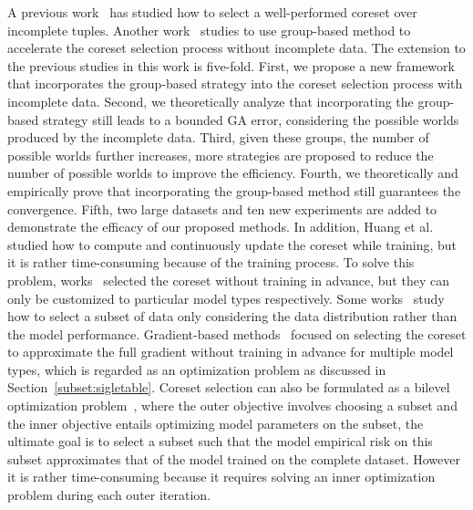  A previous work~\cite{goodcore} has studied how to select a well-performed coreset over incomplete tuples.  Another work~\cite{fastcore} studies to use group-based method to accelerate the coreset selection process without incomplete data. The extension to the previous studies in this work is five-fold. 
%
First, we propose a new framework that incorporates the group-based strategy into the coreset selection process with incomplete data.
%
 Second, we theoretically analyze that incorporating the group-based strategy   still leads to a bounded GA error, considering the possible worlds produced by the incomplete data. 
 Third, given these groups, the number of possible worlds further increases, more strategies are proposed to  reduce the number of possible worlds to improve the efficiency.
 Fourth, we theoretically and empirically  prove that incorporating the group-based method still guarantees the convergence.
  Fifth, two large datasets  and ten new experiments are added   to demonstrate the efficacy of our proposed methods. 
%
% 
%
  In addition, Huang et al.~\cite{DBLP:conf/icml/HuangHLFD21} studied how to compute and continuously update the coreset while training, %
but it is rather time-consuming because of the training process. 
 To solve this problem, works~\cite{DBLP:conf/icml/CampbellB18, DBLP:journals/corr/BravermanFL16}   selected the coreset without training in advance, but they can only be customized to particular model types respectively. %
 Some works~\cite{sener2017active,chen2012super, Zhang2019SmallGAN, Agarwal2020Context} study how to select a subset of data only considering the data distribution rather than   the model performance.
 Gradient-based methods~\cite{DBLP:conf/icml/MirzasoleimanBL20,  recon, DBLP:conf/emnlp/KirchhoffB14, Mirzasoleiman2020Coresetnoisy} focused on selecting the coreset to approximate the full gradient without training in advance for multiple model types, which is regarded as an optimization problem as discussed in Section~\ref{subset:sigletable}.
 Coreset selection can also be formulated as a bilevel optimization problem~\cite{borsos2020coresets, killamsetty2021retrieve, Killamsetty2022GLISTER}, where the outer objective involves choosing a subset and the inner objective entails optimizing model parameters on the subset, the ultimate goal is to select a subset such that the model empirical risk on this subset  approximates that of the model trained on the complete dataset. However it is rather time-consuming because it requires solving an inner optimization problem during each outer iteration. 
 
